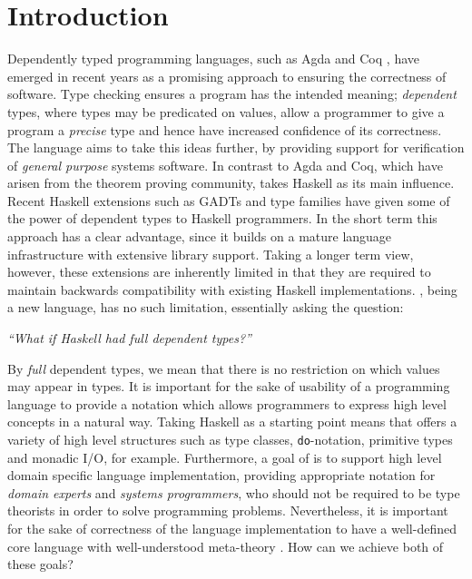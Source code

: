 \section{Introduction}

Dependently typed programming languages, such as Agda \cite{norell2007thesis}
and Coq \cite{Bertot2004}, have emerged in recent years as a promising approach
to ensuring the correctness of software. Type checking ensures a program has
the intended meaning; \emph{dependent} types, where types may be predicated
on values, allow a programmer to give a program a \emph{precise} type and 
hence have increased confidence of its correctness.
The \Idris{} language
\cite{Brady2011a} aims to take this ideas further, by providing support for
verification of \emph{general purpose} systems software. In contrast to Agda and Coq,
which have arisen from the theorem proving community, \Idris{} takes Haskell as
its main influence.  Recent Haskell extensions such as GADTs and type families have
given some of the power of dependent types to Haskell programmers. In the short
term this approach has a clear advantage, since it builds on a mature language
infrastructure with extensive library support.
Taking a longer term view, however,
these extensions are inherently limited in that they are required to maintain
backwards compatibility with existing Haskell implementations.  \Idris{}, being a new
language, has no such limitation, essentially asking the question:

\begin{center}
\emph{``What if Haskell had \emph{full} dependent types?''}
\end{center}

By \emph{full} dependent types, we mean that there is no restriction on which
values may appear in types.  It is important for the sake of usability of a
programming language to provide a notation which allows programmers to express
high level concepts in a natural way. Taking Haskell as a starting point means
that \Idris{} offers a variety of high level structures such as type classes,
\texttt{do}-notation, primitive types and monadic I/O, for example.
Furthermore, a goal of \Idris{} is to support high level domain specific
language implementation, providing appropriate notation for \emph{domain
experts} and \emph{systems programmers}, who should not be required to be type
theorists in order to solve programming problems.  Nevertheless, it is
important for the sake of correctness of the language implementation to have a
well-defined core language with well-understood meta-theory \cite{Altenkirch2010}. 
How can we achieve both of these goals?

